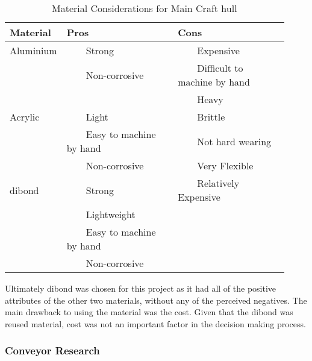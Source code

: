\documentclass [11pt]{article}
\newcommand{\tabitem}{~~\llap{\textbullet}~~}
\begin{document}
\begin{table}[H]
\centering
\setlength{\arrayrulewidth}{1.5pt}
\begin{tabular}{|p{0.12\linewidth}|p{0.4\linewidth}|p{0.4\linewidth}|}
\hline
\cellcolor{gray!40} Material & \cellcolor{gray!40}Pros & \cellcolor{gray!40} Cons \\ 
\hline
\cellcolor{gray!20} Aluminium & \cellcolor{gray!20} \tabitem Strong & \cellcolor{gray!20} \tabitem Expensive\\
\cellcolor{gray!20} & \cellcolor{gray!20} \tabitem Non-corrosive & \cellcolor{gray!20}  \tabitem Difficult to machine by hand \\
\cellcolor{gray!20} & \cellcolor{gray!20}  & \cellcolor{gray!20}  \tabitem Heavy \\
\hline
\cellcolor{gray!20} Acrylic & \cellcolor{gray!20} \tabitem Light & \cellcolor{gray!20} \tabitem Brittle\\
\cellcolor{gray!20}  & \cellcolor{gray!20} \tabitem Easy to machine by hand & \cellcolor{gray!20} \tabitem Not hard wearing \\
\cellcolor{gray!20}  & \cellcolor{gray!20} \tabitem Non-corrosive & \cellcolor{gray!20} \tabitem Very Flexible\\
\hline
\cellcolor{gray!20} \gls{dibond} & \cellcolor{gray!20} \tabitem Strong & \cellcolor{gray!20} \tabitem Relatively Expensive \\
\cellcolor{gray!20}  & \cellcolor{gray!20} \tabitem Lightweight  & \cellcolor{gray!20} \\
\cellcolor{gray!20}  & \cellcolor{gray!20} \tabitem Easy to machine by hand & \cellcolor{gray!20} \\
\cellcolor{gray!20}  & \cellcolor{gray!20}  \tabitem Non-corrosive & \cellcolor{gray!20} \\
\hline
\end{tabular}
\caption{Material Considerations for Main Craft hull}
\label{table:materials_analysis}
\end{table} 

Ultimately \gls{dibond} \cite{Dibond} was chosen for this project as it had all of the positive attributes of the other two materials, without any of the perceived negatives. The main drawback to using the material was the cost. Given that the \gls{dibond} was reused material, cost was not an important factor in the decision making process. 

\subsubsection{Conveyor Research}
\end{document}
